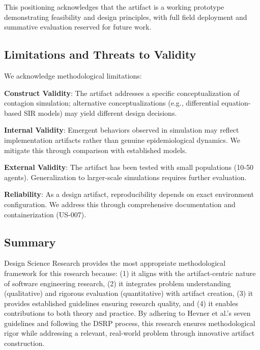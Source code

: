 This positioning acknowledges that the artifact is a working prototype demonstrating feasibility and design principles, with full field deployment and summative evaluation reserved for future work.

\subsection{Limitations and Threats to Validity}

We acknowledge methodological limitations:

\textbf{Construct Validity}: The artifact addresses a specific conceptualization of contagion simulation; alternative conceptualizations (e.g., differential equation-based SIR models) may yield different design decisions.

\textbf{Internal Validity}: Emergent behaviors observed in simulation may reflect implementation artifacts rather than genuine epidemiological dynamics. We mitigate this through comparison with established models.

\textbf{External Validity}: The artifact has been tested with small populations (10-50 agents). Generalization to larger-scale simulations requires further evaluation.

\textbf{Reliability}: As a design artifact, reproducibility depends on exact environment configuration. We address this through comprehensive documentation and containerization (US-007).

\subsection{Summary}

Design Science Research provides the most appropriate methodological framework for this research because: (1) it aligns with the artifact-centric nature of software engineering research, (2) it integrates problem understanding (qualitative) and rigorous evaluation (quantitative) with artifact creation, (3) it provides established guidelines ensuring research quality, and (4) it enables contributions to both theory and practice. By adhering to Hevner et al.'s seven guidelines and following the DSRP process, this research ensures methodological rigor while addressing a relevant, real-world problem through innovative artifact construction.
